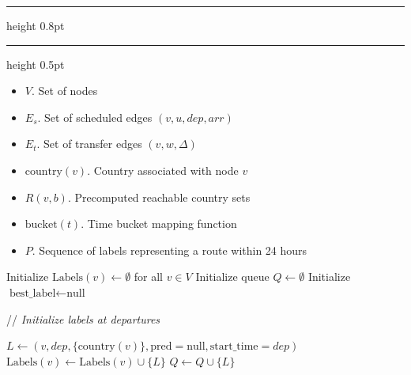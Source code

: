 \documentclass{article}
\newcommand{\CommentLine}[1]{
    \State // \textit{#1}
}
\begin{document}
\pagestyle{empty}
\allowdisplaybreaks[1] 
\setcounter{page}{1}


\setcounter{algorithm}{1}
\begin{center}
    \hrule height 0.8pt
    \vspace{0.3em}
    \label{alg:label_setting_ub_pruning}
    \vspace{0.2em}
    \hrule height 0.5pt
\end{center}

\begin{algorithmic}[1] %
    
    \Input
    \begin{itemize}
        \item $V$. Set of nodes
        \item $E_s$. Set of scheduled edges $(v,u,dep,arr)$
        \item $E_t$. Set of transfer edges $(v,w,\Delta)$
        \item $\text{country}(v)$. Country associated with node $v$
        \item $R(v,b)$. Precomputed reachable country sets
        \item $\text{bucket}(t)$. Time bucket mapping function
    \end{itemize}

    \Output
    \begin{itemize}
        \item $P$. Sequence of labels representing a route within 24 hours
    \end{itemize}
    \vspace{0.5em} 

    \State Initialize $\text{Labels}(v) \leftarrow \emptyset$ for all $v \in V$
    \State Initialize queue $Q \leftarrow \emptyset$
    \State Initialize $\text{best\_label} \leftarrow \text{null}$

    \vspace{0.5em}
    \CommentLine{Initialize labels at departures}
            \State $L \leftarrow (v,dep,\{\text{country}(v)\},\text{pred}=\text{null},\text{start\_time}=dep)$
            \State $\text{Labels}(v) \leftarrow \text{Labels}(v) \cup \{L\}$
            \State $Q \leftarrow Q \cup \{L\}$
        \EndFor
    \EndFor


\end{algorithmic}
\end{document}
